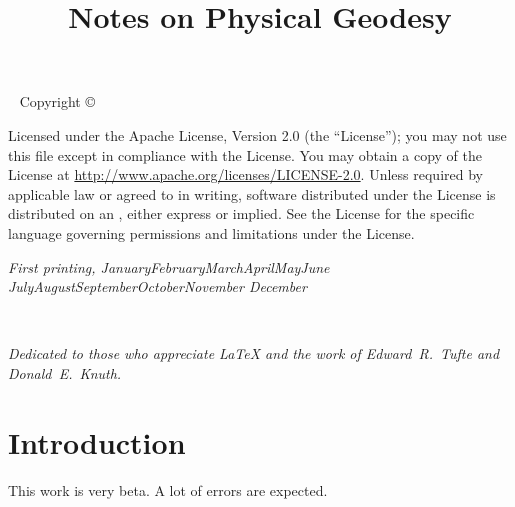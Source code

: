 \documentclass{tufte-book}
\title{Notes on Physical Geodesy}
\newcommand{\monthyear}{%
  \ifcase\month\or January\or February\or March\or April\or May\or June\or
  July\or August\or September\or October\or November\or
  December\fi\space\number\year
}
\newcommand{\blankpage}{\newpage\hbox{}\thispagestyle{empty}\newpage}
\begin{document}
\frontmatter

\blankpage




\maketitle


\newpage
\begin{fullwidth}
~\vfill
\thispagestyle{empty}
\setlength{\parindent}{0pt}
\setlength{\parskip}{\baselineskip}
Copyright \copyright\ \the\year\ \thanklessauthor

\par{}

\par{}

\par Licensed under the Apache License, Version 2.0 (the ``License''); you may not
use this file except in compliance with the License. You may obtain a copy
of the License at \url{http://www.apache.org/licenses/LICENSE-2.0}. Unless
required by applicable law or agreed to in writing, software distributed
under the License is distributed on an , either express or implied. See the
License for the specific language governing permissions and limitations
under the License.

\par\textit{First printing, \monthyear}
\end{fullwidth}

\tableofcontents

\listoffigures

\listoftables

\cleardoublepage
~\vfill
\begin{doublespace}
\noindent\fontsize{18}{22}\selectfont\itshape
\nohyphenation
Dedicated to those who appreciate \LaTeX{} 
and the work of \mbox{Edward R.~Tufte} 
and \mbox{Donald E.~Knuth}.
\end{doublespace}
\vfill
\vfill


\cleardoublepage
\chapter*{Introduction}
This work is very beta. A lot of errors are expected.
\mainmatter
\end{document}

